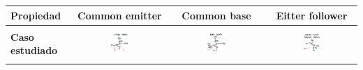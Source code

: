 \documentclass[11pt]{article}
\begin{document}
\begin{table}
	\centering
	\begin{tabular}{|p{3cm}|c|c|c|}
		\hline
		Propiedad                                  & Common emitter                                              & Common base                                                                                                                                   & Eitter follower                                    \\
		\hline
		                                           &                                                             &                                                                                                                                               &                                                    \\
		\textbf{Caso estudiado}
		                                           & \includegraphics[width=0.20\textwidth, keepaspectratio]{ce}
		                                           & \includegraphics[width=0.20\textwidth, keepaspectratio]{cb}
		                                           & \includegraphics[width=0.20\textwidth, keepaspectratio]{cc}                                                                                                                                                                                                      \\
		                                           &                                                             &                                                                                                                                               &                                                    \\

\end{tabular}
\end{table}
\end{document}
